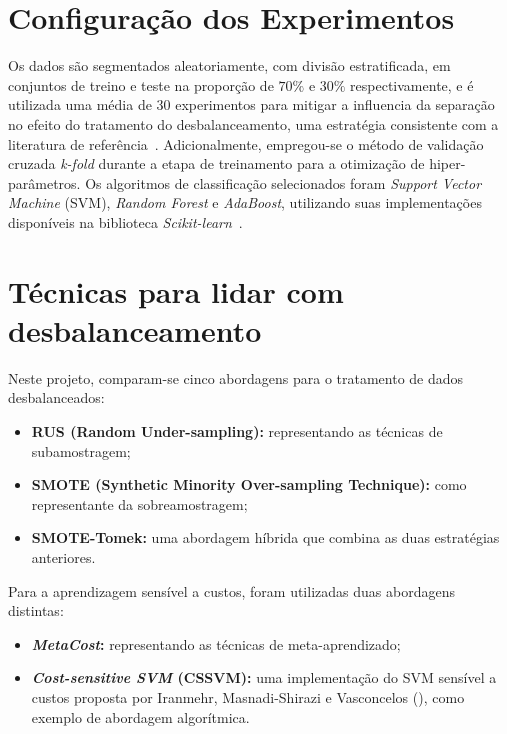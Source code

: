 \section{Configuração dos Experimentos}\label{sec:configuracao-experimentos}

Os dados são segmentados aleatoriamente, com divisão estratificada, em conjuntos de treino e teste na proporção de \(70\%\) e \(30\%\) respectivamente, e é utilizada uma média de \(30\) experimentos para mitigar a influencia da separação no efeito do tratamento do desbalanceamento, uma estratégia consistente com a literatura de referência~\cite{Namvar2018}. Adicionalmente, empregou-se o método de validação cruzada \textit{k-fold} durante a etapa de treinamento para a otimização de hiper-parâmetros. Os algoritmos de classificação selecionados foram \textit{Support Vector Machine} (SVM), \textit{Random Forest} e \textit{AdaBoost}, utilizando suas implementações disponíveis na biblioteca \textit{Scikit-learn}~\cite{Pedregosa2011scikit}.

\section{Técnicas para lidar com desbalanceamento}\label{sec:tecnicas}

Neste projeto, comparam-se cinco abordagens para o tratamento de dados desbalanceados:

\begin{itemize}
  \item \textbf{RUS (Random Under-sampling):} representando as técnicas de subamostragem;
  \item \textbf{SMOTE (Synthetic Minority Over-sampling Technique):} como representante da sobreamostragem;
  \item \textbf{SMOTE-Tomek:} uma abordagem híbrida que combina as duas estratégias anteriores.
\end{itemize}
Para a aprendizagem sensível a custos, foram utilizadas duas abordagens distintas:
\begin{itemize}
  \item \textbf{\textit{MetaCost}:} representando as técnicas de meta-aprendizado;
  \item \textbf{\textit{Cost-sensitive SVM} (CSSVM):} uma implementação do SVM sensível a custos proposta por Iranmehr, Masnadi-Shirazi e Vasconcelos (\citeyear{Iranmehr2019}), como exemplo de abordagem algorítmica.
\end{itemize}


